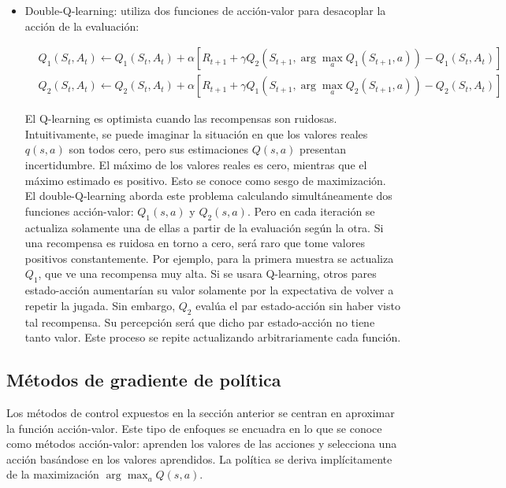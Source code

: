 \documentclass[11pt,a4paper]{article}
\begin{document}
\begin{itemize}
			En vez de evaluar el siguiente par estado-acción, usa su valor esperado. La política objetivo $\pi$ puede ser la misma que la de comportamiento (on-policy) o distinta (off-policy). Reduce la varianza asociada a elegir una única acción $A_{t+1}$ de forma aleatoria a cambio de un mayor coste computacional.
			
			\item Double-Q-learning: utiliza dos funciones de acción-valor para desacoplar la acción de la evaluación:
			
			\begin{align}
			& Q_1(S_t, A_t) \leftarrow Q_1(S_t, A_t) + \alpha \left[ R_{t+1} + \gamma Q_2(S_{t+1}, \arg\max_a Q_1(S_{t+1}, a)) - Q_1(S_t, A_t) \right] \\
			& Q_2(S_t, A_t) \leftarrow Q_2(S_t, A_t) + \alpha \left[ R_{t+1} + \gamma Q_1(S_{t+1}, \arg\max_a Q_2(S_{t+1}, a)) - Q_2(S_t, A_t) \right]
			\end{align}
			
			El Q-learning es optimista cuando las recompensas son ruidosas. Intuitivamente, se puede imaginar la situación en que los valores reales $q(s,a)$ son todos cero, pero sus estimaciones $Q(s,a)$ presentan incertidumbre. El máximo de los valores reales es cero, mientras que el máximo estimado es positivo. Esto se conoce como sesgo de maximización. \\
			
			El double-Q-learning aborda este problema calculando simultáneamente dos funciones acción-valor: $Q_1(s,a)$ y $Q_2(s,a)$. Pero en cada iteración se actualiza solamente una de ellas a partir de la evaluación según la otra. Si una recompensa es ruidosa en torno a cero, será raro que tome valores positivos constantemente. Por ejemplo, para la primera muestra se actualiza $Q_1$, que ve una recompensa muy alta. Si se usara Q-learning, otros pares estado-acción aumentarían su valor solamente por la expectativa de volver a repetir la jugada. Sin embargo, $Q_2$ evalúa el par estado-acción sin haber visto tal recompensa. Su percepción será que dicho par estado-acción no tiene tanto valor. Este proceso se repite actualizando arbitrariamente cada función.
			
		\end{itemize}
		
		\subsection{Métodos de gradiente de política}
		Los métodos de control expuestos en la sección anterior se centran en aproximar la función acción-valor. Este tipo de enfoques se encuadra en lo que se conoce como métodos acción-valor: aprenden los valores de las acciones y selecciona una acción basándose en los valores aprendidos. La política se deriva implícitamente de la maximización $\arg\max_a Q(s,a)$. \\
		
\end{document}
